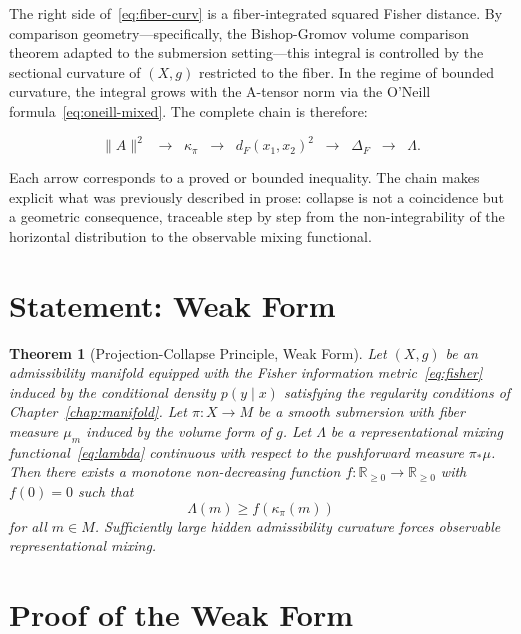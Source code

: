 \documentclass[12pt, oneside]{book}
\theoremstyle{plain-flyxion}
\newtheorem{theorem}{Theorem}[chapter]
\theoremstyle{definition-flyxion}
\newcommand{\kpi}{\kappa_{\pi}}
\newcommand{\Lam}{\Lambda}
\begin{document}
The right side of~\eqref{eq:fiber-curv} is a fiber-integrated squared Fisher distance.
By comparison geometry---specifically, the Bishop-Gromov volume comparison theorem
adapted to the submersion setting---this integral is controlled by the sectional
curvature of $(X, g)$ restricted to the fiber. In the regime of bounded curvature, the
integral grows with the A-tensor norm via the O'Neill formula~\eqref{eq:oneill-mixed}.
The complete chain is therefore:

\begin{equation}\label{eq:chain}
\|A\|^2 \;\;\longrightarrow\;\; \kpi \;\;\longrightarrow\;\;
d_F(x_1,x_2)^2 \;\;\longrightarrow\;\; \Delta_F \;\;\longrightarrow\;\; \Lam.
\end{equation}

Each arrow corresponds to a proved or bounded inequality. The chain makes explicit what
was previously described in prose: collapse is not a coincidence but a geometric
consequence, traceable step by step from the non-integrability of the horizontal
distribution to the observable mixing functional.

\section{Statement: Weak Form}

\begin{theorem}[Projection-Collapse Principle, Weak Form]\label{thm:weak}
Let $(X, g)$ be an admissibility manifold equipped with the Fisher information
metric~\eqref{eq:fisher} induced by the conditional density $p(y\mid x)$ satisfying the
regularity conditions of Chapter~\ref{chap:manifold}. Let $\pi:X\to M$ be a smooth
submersion with fiber measure $\mu_m$ induced by the volume form of $g$. Let $\Lam$ be
a representational mixing functional~\eqref{eq:lambda} continuous with respect to the
pushforward measure $\pi_*\mu$. Then there exists a monotone non-decreasing function
$f:\mathbb{R}_{\geq 0}\to\mathbb{R}_{\geq 0}$ with $f(0)=0$ such that
\begin{equation}\label{eq:weak-form}
\Lam(m) \geq f\!\left(\kpi(m)\right)
\end{equation}
for all $m\in M$. Sufficiently large hidden admissibility curvature forces observable
representational mixing.
\end{theorem}

\section{Proof of the Weak Form}
\end{document}
